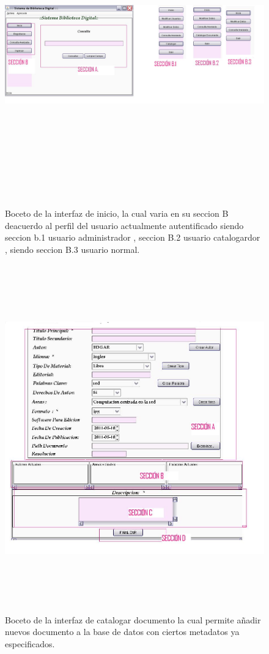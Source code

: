 \documentclass[]{article}
\begin{document}
\begin{figure}[h]
\includegraphics[width= 22cm , height= 13cm,angle=90]{Bocetos/guiPpal.jpg}
\caption{Boceto de la interfaz de inicio, la cual varia en su seccion B deacuerdo al perfil del usuario actualmente autentificado siendo seccion b.1 usuario administrador  , seccion B.2 usuario catalogardor , siendo seccion B.3 usuario normal. }
\end{figure}

\begin{figure}[h]
\includegraphics[width= 18cm , height= 15cm]{Bocetos/catalogarDoc.jpg}
\caption{Boceto de la interfaz de catalogar documento la cual permite añadir nuevos documento a la base de datos con ciertos metadatos ya especificados. }
\end{figure}
\end{document}
